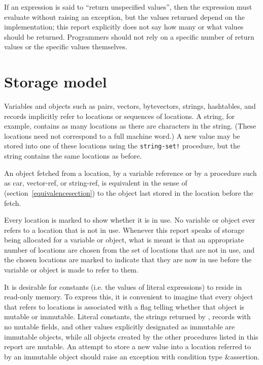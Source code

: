 \vest If an expression is said to ``return unspecified values'',
then the expression must evaluate without raising an exception, but
the values returned depend on the implementation; this report
explicitly does not say how many or what values should be returned.
Programmers should not rely on a specific number of return values or
the specific values themselves.


\section{Storage model}
\label{storagemodel}

Variables and objects such as pairs, vectors, bytevectors, strings,
hashtables, and records implicitly
refer to locations or sequences of locations.  A string, for
example, contains as many locations as there are characters in the string. 
(These locations need not correspond to a full machine word.) A new value may be
stored into one of these locations using the {\tt string-set!} procedure, but
the string contains the same locations as before.

An object fetched from a location, by a variable reference or by
a procedure such as {\cf car}, {\cf vector-ref}, or {\cf string-ref}, is
equivalent in the sense of  %
(section~\ref{equivalencesection})
to the object last stored in the location before the fetch.

Every location is marked to show whether it is in use.
No variable or object ever refers to a location that is not in use.
Whenever this report speaks of storage being allocated for a variable
or object, what is meant is that an appropriate number of locations are
chosen from the set of locations that are not in use, and the chosen
locations are marked to indicate that they are now in use before the variable
or object is made to refer to them.

It is desirable for constants (i.e. the values of
literal expressions) to reside in read-only memory.  To express this,
it is convenient to imagine that every object that refers to locations
is associated with a flag telling whether that object is
mutable or immutable.  Literal
constants, the strings returned by , records with
no mutable fields, and other values explicitly designated as immutable
are immutable objects, while all objects created by the other
procedures listed in this report are mutable.  An attempt to store a
new value into a location referred to by an immutable object
should raise an exception with condition type {\cf\&assertion}.


